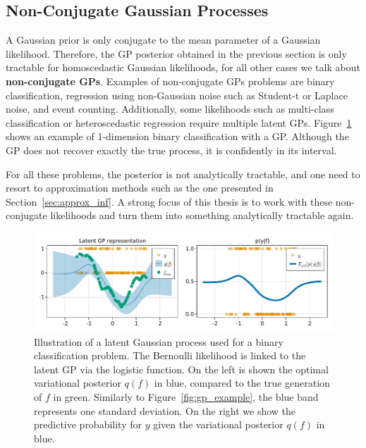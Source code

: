 \subsection{Non-Conjugate Gaussian Processes}

A Gaussian prior is only conjugate to the mean parameter of a Gaussian likelihood.
Therefore, the \ac{GP} posterior obtained in the previous section is only tractable for homoscedastic Gaussian likelihoods, for all other cases we talk about \textbf{non-conjugate \ac{GPs}}.
Examples of non-conjugate \ac{GPs} problems are binary classification, regression using non-Gaussian noise such as Student-t or Laplace noise, and event counting.
Additionally, some likelihoods such as multi-class classification or heteroscedastic regression require multiple latent \ac{GPs}.
Figure~\ref{fig:gp_class_example} shows an example of 1-dimension binary classification with a \ac{GP}.
Although the \ac{GP} does not recover exactly the true process, it is confidently in its interval.

For all these problems, the posterior is not analytically tractable, and one need to resort to approximation methods such as the one presented in Section~\ref{sec:approx_inf}.
A strong focus of this thesis is to work with these non-conjugate likelihoods and turn them into something analytically tractable again.

\begin{figure}
    \includegraphics[width=\textwidth]{./chapters/2_background/figures/GP_classification_example.pdf}
    \caption{Illustration of a latent Gaussian process used for a binary classification problem.
    The Bernoulli likelihood is linked to the latent \ac{GP} via the logistic function.
    On the left is shown the optimal variational posterior $q(f)$ in blue, compared to the true generation of $f$ in green.
    Similarly to Figure~\ref{fig:gp_example}, the blue band represents one standard deviation.
    On the right we show the predictive probability for $y$ given the variational posterior $q(f)$ in blue.}
    \label{fig:gp_class_example}
\end{figure}

